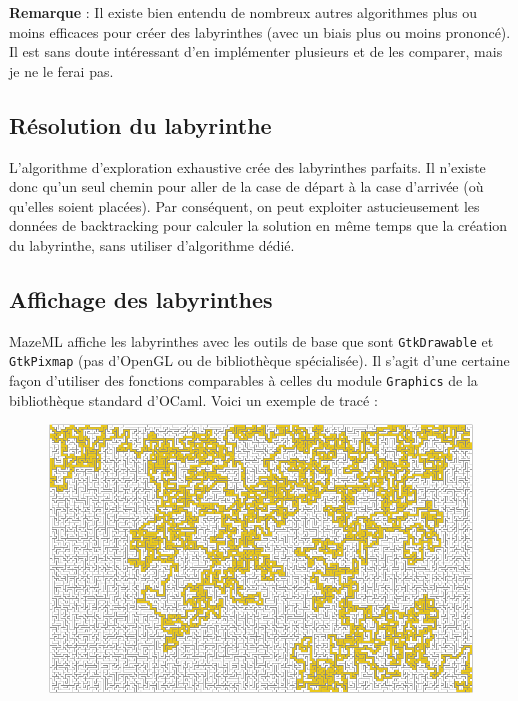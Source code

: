\documentclass[11pt]{article}
\begin{document}
  \vspace{3mm}
  \textbf{Remarque} : Il existe bien entendu de nombreux autres algorithmes plus
  ou moins efficaces pour créer des labyrinthes (avec un biais plus ou moins 
  prononcé). Il est sans doute intéressant d'en implémenter plusieurs et de les 
  comparer, mais je ne le ferai pas.

    \subsection{Résolution du labyrinthe}

    L'algorithme d'exploration exhaustive crée des labyrinthes parfaits. Il 
  n'existe donc qu'un seul chemin pour aller de la case de départ à la case 
  d'arrivée (où qu'elles soient placées). Par conséquent, on peut exploiter 
  astucieusement les données de backtracking pour calculer la solution en même 
  temps que la création du labyrinthe, sans utiliser d'algorithme dédié.

    \subsection{Affichage des labyrinthes}

    MazeML affiche les labyrinthes avec les outils de base que sont 
  \texttt{GtkDrawable} et \texttt{GtkPixmap} (pas d'OpenGL ou de bibliothèque 
  spécialisée). Il s'agit d'une certaine façon d'utiliser des fonctions 
  comparables à celles du module \texttt{Graphics} de la bibliothèque standard 
  d'OCaml. Voici un exemple de tracé :

  \begin{figure}[!ht]
    \centering
    \includegraphics[scale=0.5]{MazeML-somewhat-big-maze.png}
  \end{figure}
\end{document}
